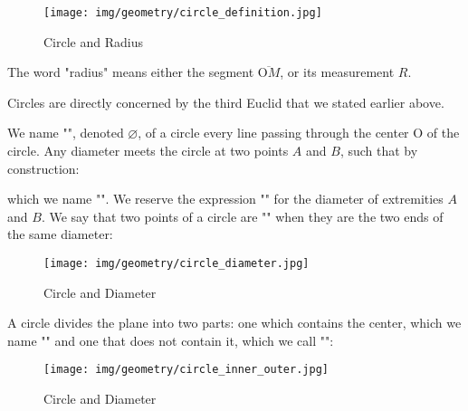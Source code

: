 	\begin{figure}[H]
		\centering
		\texttt{[image: img/geometry/circle\_definition.jpg]}
		\caption{Circle and Radius}
	\end{figure}
	\begin{tcolorbox}[title=Remark,colframe=black,arc=10pt]
	The word "radius" means either the segment $\overline{\text{O}M}$, or its measurement $R$.
	\end{tcolorbox}
	Circles are directly concerned by the third Euclid that we stated earlier above.

	We name "", denoted $\varnothing$, of a circle every line passing through the center O of the circle. Any diameter meets the circle at two points $A$ and $B$, such that by construction:
	
	which we name "". We reserve the expression "" for the diameter of extremities $A$ and $B$. We say that two points of a circle are "" when they are the two ends of the same diameter:
	\begin{figure}[H]
		\centering
		\texttt{[image: img/geometry/circle\_diameter.jpg]}
		\caption{Circle and Diameter}
	\end{figure}

	A circle divides the plane into two parts: one which contains the center, which we name "" and one that does not contain it, which we call "":
	\begin{figure}[H]
		\centering
		\texttt{[image: img/geometry/circle\_inner\_outer.jpg]}
		\caption{Circle and Diameter}
	\end{figure}
	
